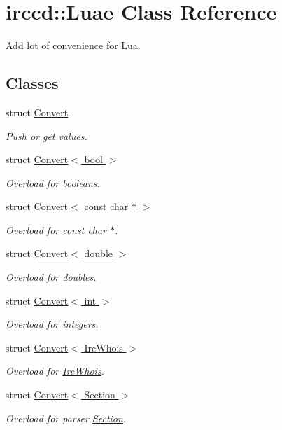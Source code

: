 \hypertarget{a00040}{\section{irccd\-:\-:Luae Class Reference}
\label{a00040}
}


Add lot of convenience for Lua.  


\subsection*{Classes}
\begin{DoxyCompactItemize}
\item 
struct \hyperlink{a00007}{Convert}
\begin{DoxyCompactList}\small\item\em Push or get values. \end{DoxyCompactList}\item 
struct \hyperlink{a00008}{Convert$<$ bool $>$}
\begin{DoxyCompactList}\small\item\em Overload for booleans. \end{DoxyCompactList}\item 
struct \hyperlink{a00009}{Convert$<$ const char $\ast$ $>$}
\begin{DoxyCompactList}\small\item\em Overload for const char $\ast$. \end{DoxyCompactList}\item 
struct \hyperlink{a00010}{Convert$<$ double $>$}
\begin{DoxyCompactList}\small\item\em Overload for doubles. \end{DoxyCompactList}\item 
struct \hyperlink{a00011}{Convert$<$ int $>$}
\begin{DoxyCompactList}\small\item\em Overload for integers. \end{DoxyCompactList}\item 
struct \hyperlink{a00012}{Convert$<$ Irc\-Whois $>$}
\begin{DoxyCompactList}\small\item\em Overload for \hyperlink{a00036}{Irc\-Whois}. \end{DoxyCompactList}\item 
struct \hyperlink{a00013}{Convert$<$ Section $>$}
\begin{DoxyCompactList}\small\item\em Overload for parser \hyperlink{a00054}{Section}. \end{DoxyCompactList}\item 

\end{DoxyCompactItemize}
